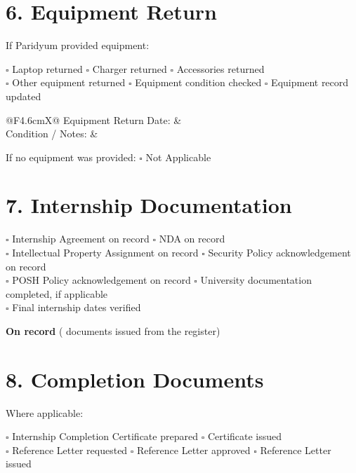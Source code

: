 \documentclass{paridyum}
\begin{document}
\section*{6. Equipment Return}
If Paridyum provided equipment:

\vspace{0.3em}
$\square$ Laptop returned \quad $\square$ Charger returned \quad
$\square$ Accessories returned \\
$\square$ Other equipment returned \quad $\square$ Equipment condition checked \quad
$\square$ Equipment record updated

\vspace{0.4em}
\begin{tabularx}{\linewidth}{@{}F{4.6cm}X@{}}
Equipment Return Date: & \dkblank \\[0.5em]
Condition / Notes:     & \dkblank
\end{tabularx}

\vspace{0.3em}
If no equipment was provided: \quad $\square$ Not Applicable

\section*{7. Internship Documentation}
$\square$ Internship Agreement on record \quad $\square$ NDA on record \\
$\square$ Intellectual Property Assignment on record \quad
$\square$ Security Policy acknowledgement on record \\
$\square$ POSH Policy acknowledgement on record \quad
$\square$ University documentation completed, if applicable \\
$\square$ Final internship dates verified

\vspace{0.5em}
\begin{softbox}
\textbf{On record} \textnormal{(\dkPDocsIssuedCount{} documents issued from the
register)}
\begin{itemize}[leftmargin=*, noitemsep, topsep=2pt]
\dkPDocsIssuedItems
\end{itemize}
\end{softbox}

\section*{8. Completion Documents}
Where applicable:

\vspace{0.3em}
$\square$ Internship Completion Certificate prepared \quad
$\square$ Certificate issued \\
$\square$ Reference Letter requested \quad $\square$ Reference Letter approved \quad
$\square$ Reference Letter issued
\end{document}
